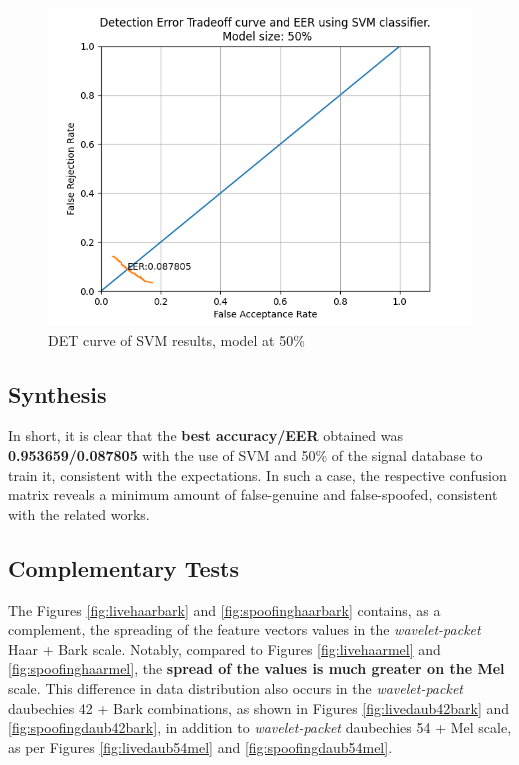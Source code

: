 			\begin{figure}[!h]
				\centering
				\includegraphics[scale=.6]{images/results/det/DET_SVM_50}
				\caption{DET curve of SVM results, model at 50\%}
				\label{fig:detsvm50}
			\end{figure}

			
		
	\subsection{Synthesis}
		\par In short, it is clear that the \textbf{best accuracy/EER} obtained was \textbf{0.953659/0.087805} with the use of SVM and 50\% of the signal database to train it, consistent with the expectations. In such a case, the respective confusion matrix reveals a minimum amount of false-genuine and false-spoofed, consistent with the related works.
		
	\subsection{Complementary Tests}
		\label{chap:testsResults:sec:Experimento05}
		
		\par The Figures \ref{fig:livehaarbark} and \ref{fig:spoofinghaarbark} contains, as a complement, the spreading of the feature vectors values in the \textit{wavelet-packet} Haar + Bark scale. Notably, compared to Figures \ref{fig:livehaarmel} and \ref{fig:spoofinghaarmel}, the \textbf{spread of the values is much greater on the Mel} scale. This difference in data distribution also occurs in the \textit{wavelet-packet} daubechies 42 + Bark combinations, as shown in Figures \ref{fig:livedaub42bark} and \ref{fig:spoofingdaub42bark}, in addition to \textit{wavelet-packet} daubechies 54 + Mel scale, as per Figures \ref{fig:livedaub54mel} and \ref{fig:spoofingdaub54mel}.
		
